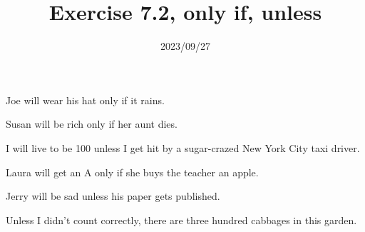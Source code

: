 
\title{Exercise 7.2, only if, unless}
\date{2023/09/27}

\maketitle

\begin{enumerate}

\begin{statement}{Joe will wear his hat only if it rains.}
\end{statement}

\begin{statement}{Susan will be rich only if her aunt dies.}
\end{statement}

\begin{statement}{I will live to be 100 unless I get hit by a sugar-crazed New
    York City taxi driver.}
\end{statement}

\begin{statement}{Laura will get an A only if she buys the teacher an apple.}
\end{statement}

\begin{statement}{Jerry will be sad unless his paper gets published.}
\end{statement}

\begin{statement}{Unless I didn’t count correctly, there are three hundred cabbages in this garden.}
\end{statement}

\end{enumerate}

